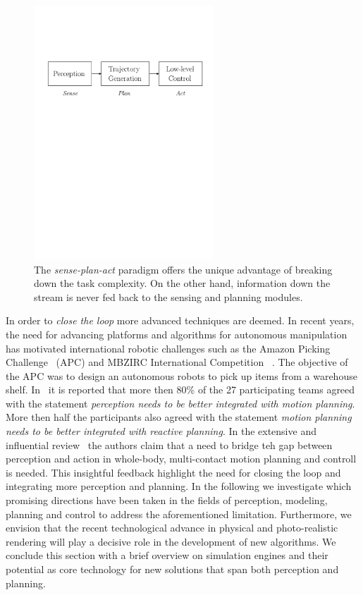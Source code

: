 \begin{figure}[h!]
    \centering
    \includegraphics[width=0.6\textwidth]{research_plan/images/sense_plan_act.pdf}
    \caption{The \emph{sense-plan-act} paradigm offers the unique advantage of breaking down the task complexity. On the other hand, information down the stream is never fed back to the sensing and planning modules.}
    \label{fig:sense_plan_act}
\end{figure}

In order to \emph{close the loop} more advanced techniques are deemed. In recent years, the need for advancing platforms and  
algorithms for autonomous manipulation has motivated international robotic challenges such as the Amazon Picking Challenge~\cite{correll2016analysis} (APC) and MBZIRC International Competition ~\cite{baca2020autonomous}. The objective of the APC was to design an autonomous robots to pick up items from a warehouse shelf. In~\cite{cooper2020ari} it is reported that more then 80\% of the 27 participating teams agreed with the statement \emph{perception needs to be better integrated with motion planning}. More then half the participants also agreed with the statement \emph{motion planning needs to be better integrated with reactive planning}. In the extensive and influential review~\cite{bohg2017interactive} the authors claim that a need to bridge teh gap between perception and action in whole-body, multi-contact motion planning and controll is needed. This insightful feedback highlight the need for closing the loop and integrating more perception and planning. In the following we investigate which promising directions have been taken in the fields of perception, modeling, planning and control to address the aforementioned limitation. Furthermore, we envision that the recent technological advance in physical and photo-realistic rendering will play a decisive role in the development of new algorithms. We conclude this section with a brief overview on simulation engines and their potential as core technology for new solutions that span both perception and planning. 

